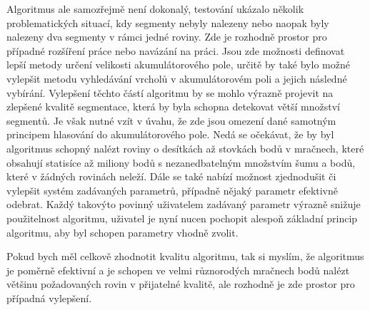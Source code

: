 \documentclass[11pt,twoside,a4paper]{book}
\begin{document}
Algoritmus ale samozřejmě není dokonalý, testování ukázalo několik problematických situací, kdy segmenty nebyly nalezeny nebo naopak byly nalezeny dva segmenty v rámci jedné roviny. Zde je rozhodně prostor pro případné rozšíření práce nebo navázání na práci. Jsou zde možnosti definovat lepší metody určení velikosti akumulátorového pole, určitě by také bylo možné vylepšit metodu vyhledávání vrcholů v akumulátorovém poli a jejich následné vybírání. Vylepšení těchto částí algoritmu by se mohlo výrazně projevit na zlepšené kvalitě segmentace, která by byla schopna detekovat větší množství segmentů. Je však nutné vzít v úvahu, že zde jsou omezení dané samotným principem hlasování do akumulátorového pole. Nedá se očekávat, že by byl algoritmus schopný nalézt roviny o desítkách až stovkách bodů v mračnech, které obsahují statisíce až miliony bodů s nezanedbatelným množstvím šumu a bodů, které v žádných rovinách neleží. Dále se také nabízí možnost zjednodušit či vylepšit systém zadávaných parametrů, případně nějaký parametr efektivně odebrat. Každý takovýto povinný uživatelem zadávaný parametr výrazně snižuje použitelnost algoritmu, uživatel je nyní nucen pochopit alespoň základní princip algoritmu, aby byl schopen parametry vhodně zvolit.

Pokud bych měl celkově zhodnotit kvalitu algoritmu, tak si myslím, že algoritmus je poměrně efektivní a je schopen ve velmi různorodých mračnech bodů nalézt většinu po\-ža\-do\-va\-ných rovin v přijatelné kvalitě, ale rozhodně je zde prostor pro případná vylepšení.





%




%
\def\CS{$\cal C\kern-0.1667em\lower.5ex\hbox{$\cal S$}\kern-0.075em $}

\end{document}
